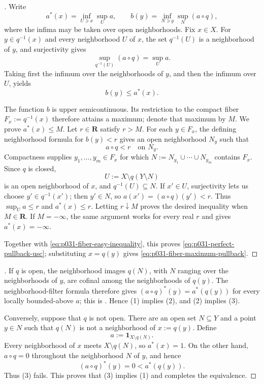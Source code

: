
\begin{proof}[]
Write
\[
 a^*(x)=\inf_{U\ni x}\sup_U a,
 \qquad
 b(y)=\inf_{N\ni y}\sup_N(a\circ q),
\]
where the infima may be taken over open neighborhoods.  Fix $x\in X$.
For $y\in q^{-1}(x)$ and every neighborhood $U$ of $x$, the set
$q^{-1}(U)$ is a neighborhood of $y$, and surjectivity gives
\[
 \sup_{q^{-1}(U)}(a\circ q)=\sup_Ua.
\]
Taking first the infimum over the neighborhoods of $y$, and then the
infimum over $U$, yields
\begin{equation}
\label{eq:p031-fiber-easy-inequality}
                         b(y)\leq a^*(x).
\end{equation}

The function $b$ is upper semicontinuous.  Its restriction to the compact
fiber $F_x:=q^{-1}(x)$ therefore attains a maximum; denote that maximum by
$M$.  We prove $a^*(x)\leq M$.  Let $r\in\mathbf R$ satisfy $r>M$.
For each $y\in F_x$, the defining neighborhood formula for $b(y)<r$
gives an open neighborhood $N_y$ such that
\[
                         a\circ q<r\quad\text{on }N_y.
\]
Compactness supplies $y_1,\ldots,y_m\in F_x$ for which
$
 N:=N_{y_1}\cup\cdots\cup N_{y_m}
$
contains $F_x$.  Since $q$ is closed,
\[
                         U:=X\setminus q(Y\setminus N)
\]
is an open neighborhood of $x$, and $q^{-1}(U)\subseteq N$.  If
$x'\in U$, surjectivity lets us choose $y'\in q^{-1}(x')$; then
$y'\in N$, so $a(x')=(a\circ q)(y')<r$.  Thus
$
 \sup_Ua\leq r
$
and $a^*(x)\leq r$.  Letting $r\downarrow M$ proves the desired
inequality when $M\in\mathbf R$.  If $M=-\infty$, the same argument
works for every real $r$ and gives $a^*(x)=-\infty$.

Together with \eqref{eq:p031-fiber-easy-inequality}, this proves
\eqref{eq:p031-perfect-pullback-usc}; substituting $x=q(y)$ gives
\eqref{eq:p031-fiber-maximum-pullback}.
\end{proof}

\begin{proof}[]
If $q$ is open, the neighborhood images $q(N)$, with $N$ ranging over
the neighborhoods of $y$, are cofinal among the neighborhoods of
$q(y)$.  The neighborhood-filter formula therefore gives
$
 (a\circ q)^*(y)=a^*(q(y))
$
for every locally bounded-above $a$; this is
.  Hence (1) implies (2), and (2)
implies (3).

Conversely, suppose that $q$ is not open.  There are an open set
$N\subseteq Y$ and a point $y\in N$ such that $q(N)$ is not a
neighborhood of $x:=q(y)$.  Define
\[
                  a:=\mathbf 1_{X\setminus q(N)}.
\]
Every neighborhood of $x$ meets $X\setminus q(N)$, so $a^*(x)=1$.
On the other hand, $a\circ q=0$ throughout the neighborhood $N$ of
$y$, and hence
\[
                  (a\circ q)^*(y)=0<a^*(q(y)).
\]
Thus (3) fails.  This proves that (3) implies (1) and completes the
equivalence.
\end{proof}

